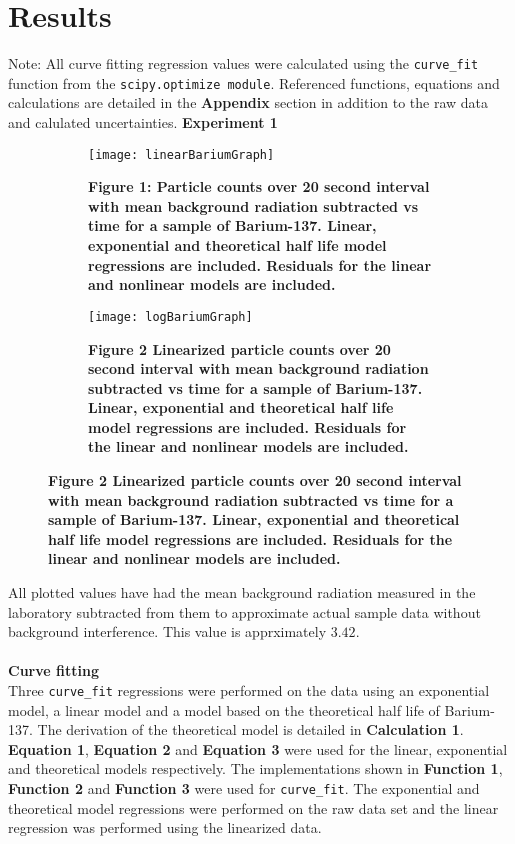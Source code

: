 \documentclass[
	letterpaper, %
	10pt, %
]{CSUniSchoolLabReport}
\begin{document}
\section{Results}
Note: All curve fitting regression values were calculated using the \lstinline{curve_fit} function from the \lstinline{scipy.optimize module}. Referenced functions, equations and calculations are detailed in the \textbf{Appendix} section in addition to the raw data and calulated uncertainties.
\newpage
{\Large\textbf{Experiment 1}}
\begin{figure}[H]
	\begin{subfigure}{0.45\textwidth}
		\texttt{[image: linearBariumGraph]}
		\caption{\textbf{Figure 1: Particle counts over 20 second interval with mean background radiation subtracted vs time for a sample of Barium-137. Linear, exponential and theoretical half life model regressions are included. Residuals for the linear and nonlinear models are included.}}
	\end{subfigure}
	\quad
	\begin{subfigure}{0.45\textwidth}
		\texttt{[image: logBariumGraph]}
		\caption{\textbf{Figure 2 Linearized particle counts over 20 second interval with mean background radiation subtracted vs time for a sample of Barium-137.  Linear, exponential and theoretical half life model regressions are included. Residuals for the linear and nonlinear models are included.}}
	\end{subfigure}
\end{figure}
All plotted values have had the mean background radiation measured in the laboratory subtracted from them to approximate actual sample data without background interference. This value is apprximately $3.42$.\\\\
{\large\textbf{Curve fitting}}\\
Three \lstinline{curve_fit} regressions were performed on the data using an exponential model, a linear model and a
model based on the theoretical half life of Barium-137. The derivation of the theoretical model is detailed in
\textbf{Calculation 1}. \textbf{Equation 1}, \textbf{Equation 2} and \textbf{Equation 3} were used for the linear, exponential and
theoretical models respectively. The implementations shown in \textbf{Function 1}, \textbf{Function 2} and \textbf{Function 3} were used for \lstinline{curve_fit}. The exponential
and theoretical model regressions were performed on the raw data set and the linear regression was
performed using the linearized data.\\\\
\end{document}
